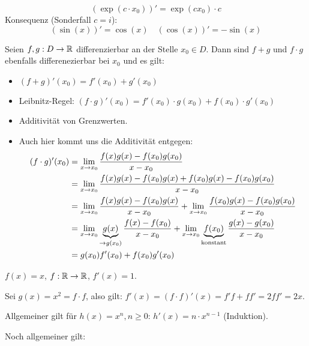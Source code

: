 \documentclass[main.tex]{subfiles}
\begin{document}
\begin{Theorem}
  $$(\exp(c\cdot x_0))' = \exp(c x_0) \cdot c$$
  Konsequenz (Sonderfall $c = i$):
  $$(\sin(x))' = \cos(x) \quad (\cos(x))' = -\sin(x)$$
\end{Theorem}

\begin{Theorem}
  Seien $f,g: D \to \mathbb{R}$ differenzierbar an der Stelle $x_0 \in D$. Dann sind $f+g$ und $f\cdot g$ ebenfalls differenezierbar bei $x_0$ und es gilt:
  \begin{itemize}
    \item $(f+g)'(x_0) = f'(x_0) + g'(x_0)$
    \item Leibnitz-Regel: $(f\cdot g)'(x_0) = f'(x_0) \cdot g(x_0) + f(x_0) \cdot g'(x_0)$
  \end{itemize}
\end{Theorem}

\begin{Beweis}
  \begin{itemize}
    \item Additivität von Grenzwerten.
    \item Auch hier kommt uns die Additivität entgegen:
      $$\begin{aligned}
      (f \cdot g)'(x_0)&  = \lim \limits_{x \to x_0} \dfrac{f(x)g(x) - f(x_0)g(x_0)}{x-x_0}\\
      & = \lim \limits_{x \to x_0} \dfrac{f(x)g(x) - f(x_0)g(x) + f(x_0)g(x) - f(x_0)g(x_0)}{x-x_0}\\
      & = \lim \limits_{x \to x_0} \dfrac{f(x)g(x) - f(x_0)g(x)}{x-x_0} + \lim \limits_{x \to x_0} \dfrac{f(x_0)g(x) - f(x_0)g(x_0)}{x-x_0}\\
      & = \lim \limits_{x \to x_0} \underbrace{g(x)}_{\to g(x_0)} \dfrac{f(x) - f(x_0)}{x-x_0} + \lim \limits_{x \to x_0} \underbrace{f(x_0)}_{\text{konstant}} \dfrac{g(x) - g(x_0)}{x-x_0}\\
      & = g(x_0)f'(x_0) + f(x_0)g'(x_0)
    \end{aligned}$$
  \end{itemize}
\end{Beweis}

\begin{Bemerkung}[Konsequenz]
  $f(x) = x$, $f: \mathbb{R} \to \mathbb{R}$, $f'(x) = 1$.

  Sei $g(x) = x^2 = f \cdot f$, also gilt: $f'(x) = (f \cdot f)'(x) = f'f + ff' = 2ff' = 2x$.

  Allgemeiner gilt für $h(x) = x^n, n \geq 0$: $h'(x) = n \cdot x^{n-1}$ (Induktion).
\end{Bemerkung}

Noch allgemeiner gilt:
\end{document}
